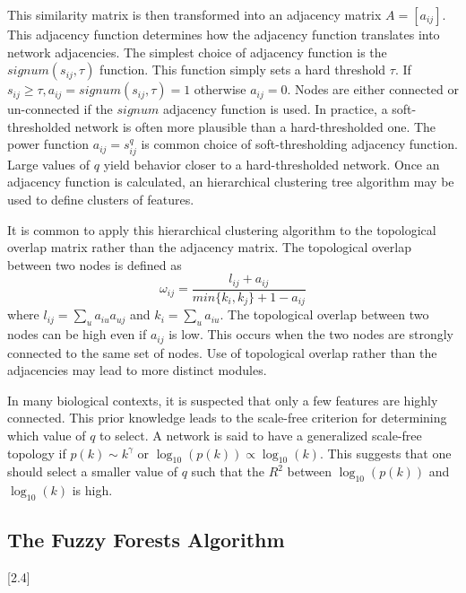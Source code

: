 \documentclass[article,shortnames]{jss}
\begin{document}
This similarity matrix is then transformed into an adjacency matrix $A=[a_{ij}]$.  This adjacency function determines how the adjacency function
translates into network adjacencies.  The simplest choice of adjacency function is the $signum(s_{ij},\tau)$ function.  This function
simply sets a hard threshold $\tau$.  If $s_{ij} \geq \tau, a_{ij}=signum(s_{ij},\tau)=1$ otherwise $a_{ij}=0$.  Nodes are either connected or 
un-connected if the $signum$ adjacency function is used.  In practice, a soft-thresholded network is often more plausible than a 
hard-thresholded one.  The power function $a_{ij}=s_{ij}^{q}$ is common choice of soft-thresholding adjacency function.  Large values
of $q$ yield behavior closer to a hard-thresholded network.  Once an adjacency function is calculated, an hierarchical clustering tree algorithm 
may be used to define clusters of features.

It is common to apply this hierarchical clustering algorithm to the topological overlap matrix rather than the adjacency matrix.  The topological
overlap between two nodes is defined as 
\begin{equation}
\omega_{ij} = \frac{l_{ij} + a_{ij}}{min\{k_{i},k_{j}\} + 1 - a_{ij}}
\end{equation} 
where $l_{ij}=\sum_{u}a_{iu}a_{uj}$ and $k_{i}=\sum_{u}a_{iu}$.  The topological overlap between two nodes can be high even if $a_{ij}$ is low.
This occurs when the two nodes are strongly connected to the same set of nodes.  Use of topological overlap rather
than the adjacencies may lead to more distinct modules.

In many biological contexts, it is suspected that only a few features are highly connected.  This prior knowledge leads to the scale-free criterion for
determining which value of $q$ to select.  A network is said to have a generalized scale-free topology if $p(k) \sim k^{\gamma}$ or
 $\log_{10}(p(k)) \propto \log_{10}(k)$.  This suggests that one should select a smaller value of $q$ such that the $R^{2}$ between 
  $\log_{10}(p(k))$ and $\log_{10}(k)$ is high.
  
  \subsection{The Fuzzy Forests Algorithm}[2.4]



\end{document}

